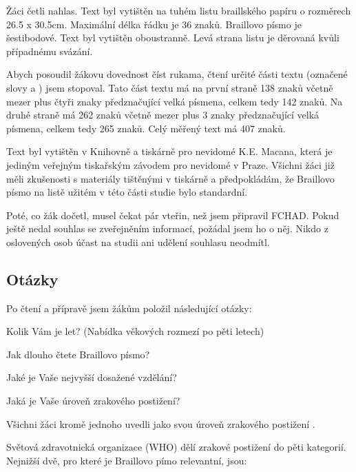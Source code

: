 Žáci četli nahlas. Text byl vytištěn na tuhém listu braillského papíru o rozměrech 26.5 x 30.5cm.  Maximální délka řádku je 36 znaků.  Braillovo písmo je šestibodové.  Text byl vytištěn oboustranně. Levá strana listu je děrovaná kvůli případnému svázání.

Abych posoudil žákovu dovednost číst rukama, čtení určité části textu (označené slovy  a ) jsem stopoval. Tato část textu má na první straně 138 znaků včetně mezer plus čtyři znaky předznačující velká písmena, celkem tedy 142 znaků. Na druhé straně má 262 znaků včetně mezer plus 3 znaky předznačující velká písmena, celkem tedy 265 znaků. Celý měřený text má 407 znaků.

Text byl vytištěn v Knihovně a tiskárně pro nevidomé K.E. Macana, která je jediným veřejným tiskařským závodem pro nevidomé v Praze.  Všichni žáci již měli zkušenosti s materiály tištěnými v tiskárně a předpokládám, že Braillovo písmo na listě užitém v této části studie bylo standardní.

Poté, co žák dočetl, musel čekat pár vteřin, než jsem připravil FCHAD. Pokud ještě nedal souhlas se zveřejněním informací, požádal jsem ho o něj.  Nikdo z oslovených osob účast na studii ani udělení souhlasu neodmítl.

\subsection{Otázky}

Po čtení a přípravě jsem žákům položil následující otázky:

Kolik Vám je let? (Nabídka věkových rozmezí po pěti letech)

Jak dlouho čtete Braillovo písmo?

Jaké je Vaše nejvyšší dosažené vzdělání?

Jaká je Vaše úroveň zrakového postižení?

Všichni žáci kromě jednoho uvedli jako svou úroveň zrakového postižení .

Světová zdravotnická organizace (WHO) dělí zrakové postižení do pěti kategorií. Nejnižší dvě, pro které je Braillovo pímo relevantní, jsou:

  \citep{sonsklasifikace}

